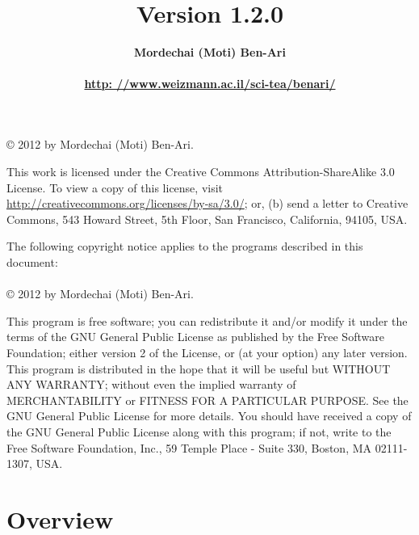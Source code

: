 \documentclass[11pt]{report}
\title{\bfseries \ls\\\mbox{}\\\mbox{}\\
\bfseries\normalsize Version 1.2.0}
\author{\bfseries Mordechai (Moti) Ben-Ari\\\mbox{}\\
\url{http: //www.weizmann.ac.il/sci-tea/benari/}}
\begin{document}
\maketitle

\thispagestyle{empty}

\vspace*{\fill}

\begin{center}
\copyright{} 2012 by Mordechai (Moti) Ben-Ari.
\end{center}
This work is licensed under the Creative Commons Attribution-ShareAlike 3.0
License. To view a copy of this license, visit
\url{http://creativecommons.org/licenses/by-sa/3.0/}; or, (b) send a letter
to Creative Commons, 543 Howard Street, 5th Floor, San Francisco,
California, 94105, USA.

\bigskip\bigskip

 
\begin{center}
The following copyright notice applies to the programs described in this
document:\mbox{}\\\mbox{}\\
\copyright{} 2012 by Mordechai (Moti) Ben-Ari.
\end{center}

This program is free software; you can redistribute it and/or
modify it under the terms of the GNU General Public License
as published by the Free Software Foundation; either version 2
of the License, or (at your option) any later version.
This program is distributed in the hope that it will be useful
but WITHOUT ANY WARRANTY; without even the implied warranty of
MERCHANTABILITY or FITNESS FOR A PARTICULAR PURPOSE.
See the GNU General Public License for more details.
You should have received a copy of the GNU General Public License
along with this program; if not, write to the Free Software
Foundation, Inc., 59 Temple Place - Suite 330, Boston, MA
02111-1307, USA.

\vspace*{\fill}

\tableofcontents

\thispagestyle{empty}

\setcounter{page}{0}


\newpage

\section*{Overview}
\end{document}
